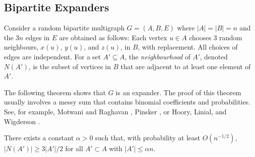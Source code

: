 \documentclass{patmorin}
\begin{document}
\subsection{Bipartite Expanders}

Consider a random bipartite multigraph $G=(A,B,E)$ where $|A|=|B|=n$
and the $3n$ edges in $E$ are obtained as follows:  Each vertex $u\in A$
chooses 3 random neighbours, $x(u)$, $y(u)$, and $z(u)$, in $B$, with
replacement.  All choices of edges are independent. For a set $A'\subseteq
A$, the \emph{neighbourhood} of $A'$, denoted $N(A')$, is the subset of
vertices in $B$ that are adjacent to at least one element of $A'$.

The following theorem shows that $G$ is an expander.  The proof of
this theorem usually involves a messy sum that contains binomial
coefficients and probabilities.  See, for example, Motwani and
Raghavan \cite[Theorem~5.3]{motwani.raghavan:randomized}, Pinsker
\cite[Lemma 1]{pinsker:on}, or Hoory, Linial, and Wigderson
\cite[Lemma~1.9]{hoory.linial.ea:expander}.

\begin{thm}
  There exists a constant $\alpha >0$ such that, with probability at
  least $O(n^{-1/2})$, $|N(A')| \ge 3|A'|/2$ for all $A'\subset A$
  with $|A'|\le \alpha n$.
\end{thm}
\end{document}
